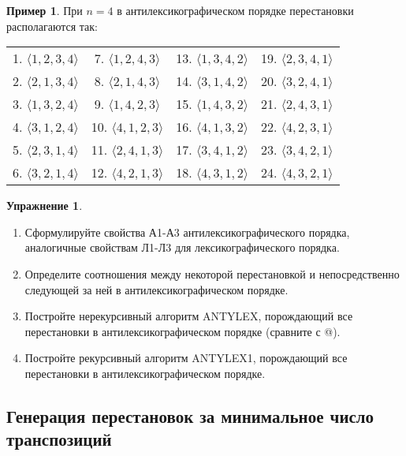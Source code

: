 \documentclass[12pt,a4paper]{article}
\theoremstyle{plain}
\theoremstyle{definition}
\newtheorem*{task}{Упражнение}
\newtheorem*{example}{Пример}
\theoremstyle{remark}
\begin{document}
\begin{example}
При $n=4$ в антилексикографическом порядке перестановки располагаются так:

\begin{tabular}{cccc}
1. $\langle1, 2, 3, 4\rangle$ & 7. $\langle1, 2, 4, 3\rangle$ & 13. $\langle1, 3, 4, 2\rangle$ & 19. $\langle2, 3, 4, 1\rangle$ \\
2. $\langle2, 1, 3, 4\rangle$ & 8. $\langle2, 1, 4, 3\rangle$ & 14. $\langle3, 1, 4, 2\rangle$ & 20. $\langle3, 2, 4, 1\rangle$ \\
3. $\langle1, 3, 2, 4\rangle$ & 9. $\langle1, 4, 2, 3\rangle$ & 15. $\langle1, 4, 3, 2\rangle$ & 21. $\langle2, 4, 3, 1\rangle$ \\
4. $\langle3, 1, 2, 4\rangle$ & 10. $\langle4, 1, 2, 3\rangle$ & 16. $\langle4, 1, 3, 2\rangle$ & 22. $\langle4, 2, 3, 1\rangle$ \\
5. $\langle2, 3, 1, 4\rangle$ & 11. $\langle2, 4, 1, 3\rangle$ & 17. $\langle3, 4, 1, 2\rangle$ & 23. $\langle3, 4, 2, 1\rangle$ \\
6. $\langle3, 2, 1, 4\rangle$ & 12. $\langle4, 2, 1, 3\rangle$ & 18. $\langle4, 3, 1, 2\rangle$ &24. $\langle4, 3, 2 ,1\rangle$ \\
\end{tabular}
\end{example}

\begin{task}
\begin{enumerate}
\item Сформулируйте свойства А1-А3 антилексикографического порядка, аналогичные свойствам Л1-Л3 для лексикографического порядка.
\item Определите соотношения между некоторой перестановкой и непосредственно следующей за ней в антилексикографическом порядке.
\item Постройте нерекурсивный алгоритм ANTYLEX, порождающий все перестановки в антилексикографическом порядке (сравните с \verb@[1]@).
\item Постройте рекурсивный алгоритм ANTYLEX1, порождающий все перестановки в антилексикографическом порядке.
\end{enumerate}
\end{task}

\subsection{Генерация перестановок за минимальное число транспозиций}
\end{document}
